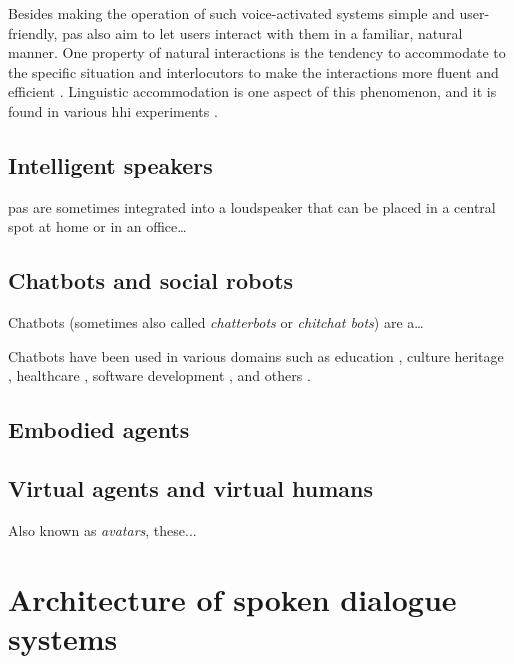 Besides making the operation of such voice-activated systems simple and user-friendly, \acp{pa} also aim to let users interact with them in a familiar, natural manner.
One property of natural interactions is the tendency to accommodate to the specific situation and interlocutors to make the interactions more fluent and efficient \citep{Giles1991CAT,Gallois2015CAT}.
Linguistic accommodation is one aspect of this phenomenon, and it is found in various \ac{hhi} experiments \citep[e.g.,][]{Pardo2017phonetic,Schweitzer2017social}.

\subsection{Intelligent speakers}
\label{subsec:intelligent_speakers}

\Acp{pa} are sometimes integrated into a loudspeaker that can be placed in a central spot at home or in an office\ldots

\subsection{Chatbots and social robots}
\label{subsec:chatbots}

Chatbots (sometimes also called \emph{chatterbots} or \emph{chitchat bots}) are a\ldots


Chatbots have been used in various domains such as education \citep{Benotti2014engaging, Kerly2007bringing}, culture heritage \citep{Pilato2005expert}, healthcare \citep{Kowatsch2017text}, software development \citep{Lebeuf2017software}, and others \citep{Shawar2007chatbots}.

\subsection{Embodied agents}
\label{subsec:embodied_agents}

\subsection{Virtual agents and virtual humans}
\label{subsec:virtual_agents}

Also known as \textit{avatars}, these...

\section{Architecture of spoken dialogue systems}
\label{sec:architecture_sds}

